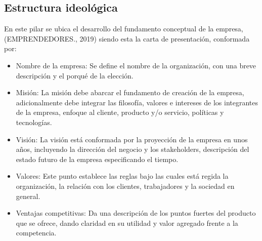 \subsection{Estructura ideológica}

En este pilar se ubica el desarrollo del fundamento conceptual de la empresa, (EMPRENDEDORES., 2019) siendo esta la carta de presentación, conformada por:

\begin{itemize}
    \item Nombre de la empresa: Se define el nombre de la organización, con una breve descripción y el porqué de la elección.
    
    \item Misión: La misión debe abarcar el fundamento de creación de la empresa, adicionalmente debe integrar las filosofía, valores e intereses de los integrantes de la empresa, enfoque al cliente, producto y/o servicio, políticas y tecnologías.
    
    \item Visión: La visión está conformada por la proyección de la empresa en unos años, incluyendo la dirección del negocio y los stakeholders, descripción del estado futuro de la empresa especificando el tiempo.
    
    \item Valores: Este punto establece las reglas bajo las cuales está regida la organización, la relación con los clientes, trabajadores y la sociedad en general.
    
    \item Ventajas competitivas: Da una descripción de los puntos fuertes del producto que se ofrece, dando claridad en su utilidad y valor agregado frente a la competencia.
\end{itemize}
